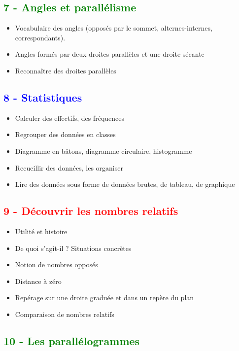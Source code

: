 \documentclass[12pt]{article}
\begin{document}
\begin{multicols}{2}
\subsection*{\textcolor{green}{7 - Angles et parallélisme}}

\begin{itemize}
\item Vocabulaire des angles (opposés par le sommet, alternes-internes, correspondants).
\item Angles formés par deux droites parallèles et une droite sécante
\item Reconnaître des droites parallèles
\end{itemize}

\subsection*{\textcolor{blue}{8 - Statistiques}}

\begin{itemize}
\item Calculer des effectifs, des fréquences
\item Regrouper des données en classes
\item Diagramme en bâtons, diagramme circulaire, histogramme
\item Recueillir des données, les organiser
\item Lire des données sous forme de données brutes, de tableau, de graphique
\end{itemize}

\subsection*{\textcolor{red}{9 - Découvrir les nombres relatifs}}

\begin{itemize}
\item Utilité et histoire
\item De quoi s'agit-il ? Situations concrètes
\item Notion de nombres opposés
\item Distance à zéro
\item Repérage sur une droite graduée et dans un repère du plan
\item Comparaison de nombres relatifs
\end{itemize}

\subsection*{\textcolor{green}{10 - Les parallélogrammes}}


\end{multicols}
\end{document}
